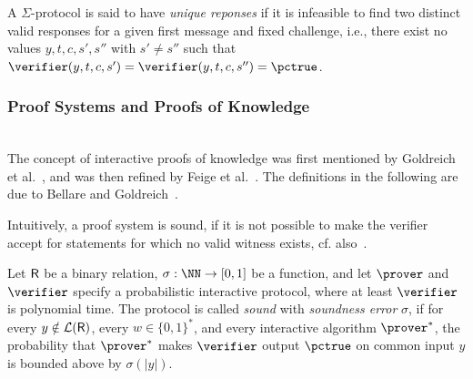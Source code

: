 \documentclass[runningheads]{llncs}
\begin{document}
A $\Sigma$-protocol is said to have \emph{unique reponses} if it is infeasible to find two distinct valid responses for a given first message and fixed challenge, i.e., there exist no values $y,t,c,s',s''$ with $s'\ne s''$ such that $\verifier(y,t,c,s')=\verifier(y,t,c,s'')=\accept$.

\subsubsection{Proof Systems and Proofs of Knowledge}~\\

The concept of interactive proofs of knowledge was first mentioned by Goldreich et al.~\cite{STOC:GolMicRac85}, and was then refined by Feige et al.~\cite{STOC:FeiFiaSha87}.
The definitions in the following are due to Bellare and Goldreich~\cite{C:BelGol92}.

Intuitively, a proof system is sound, if it is not possible to make the verifier accept for statements for which no valid witness exists, cf. also~\cite[1.6.2]{zkproof-reference}.
\begin{definition}\label{def:soundness}
  Let $\mathsf{R}$ be a binary relation, $\sigma:\NN\to[0,1]$ be a function, and let $\prover$ and $\verifier$ specify a probabilistic interactive protocol, where at least $\verifier$ is polynomial time.
  The protocol is called \emph{sound} with \emph{soundness error} $\sigma$, if for every $y\notin\mathcal{L}(\mathsf{R})$, every $w\in\{0,1\}^*$, and every interactive algorithm $\prover^*$, the probability that $\prover^*$ makes $\verifier$ output $\accept$ on common input $y$ is bounded above by $\sigma(|y|)$.
\end{definition}
\end{document}
